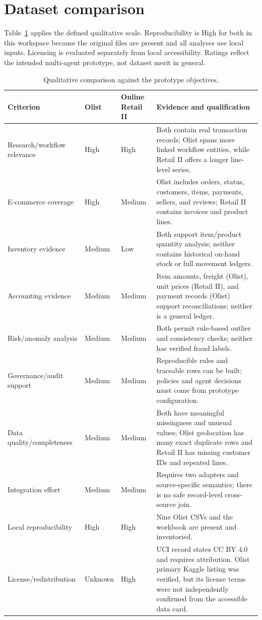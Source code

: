 \documentclass[11pt,a4paper]{article}
\begin{document}
\section{Dataset comparison}
Table~\ref{tab:comparison} applies the defined qualitative scale. Reproducibility is High for both in this workspace because the original files are present and all analyses use local inputs. Licensing is evaluated separately from local accessibility. Ratings reflect the intended multi-agent prototype, not dataset merit in general.
\begin{table}[ht]
\centering\small
\caption{Qualitative comparison against the prototype objectives.}
\label{tab:comparison}
\begin{tabularx}{\textwidth}{>{\raggedright\arraybackslash}p{}>{\raggedright\arraybackslash}p{}>{\raggedright\arraybackslash}p{}>{\raggedright\arraybackslash}X}
\toprule
Criterion & Olist & Online Retail II & Evidence and qualification\\
\midrule
Research/workflow relevance & High & High & Both contain real transaction records; Olist spans more linked workflow entities, while Retail II offers a longer line-level series.\\
E-commerce coverage & High & Medium & Olist includes orders, status, customers, items, payments, sellers, and reviews; Retail II contains invoices and product lines.\\
Inventory evidence & Medium & Low & Both support item/product quantity analysis; neither contains historical on-hand stock or full movement ledgers.\\
Accounting evidence & Medium & Medium & Item amounts, freight (Olist), unit prices (Retail II), and payment records (Olist) support reconciliations; neither is a general ledger.\\
Risk/anomaly analysis & Medium & Medium & Both permit rule-based outlier and consistency checks; neither has verified fraud labels.\\
Governance/audit support & Medium & Medium & Reproducible rules and traceable rows can be built; policies and agent decisions must come from prototype configuration.\\
Data quality/completeness & Medium & Medium & Both have meaningful missingness and unusual values; Olist geolocation has many exact duplicate rows and Retail II has missing customer IDs and repeated lines.\\
Integration effort & Medium & Medium & Requires two adapters and source-specific semantics; there is no safe record-level cross-source join.\\
Local reproducibility & High & High & Nine Olist CSVs and the workbook are present and inventoried.\\
License/redistribution & Unknown & High & UCI record states CC BY 4.0 and requires attribution. Olist primary Kaggle listing was verified, but its license terms were not independently confirmed from the accessible data card.\\
\bottomrule
\end{tabularx}
\end{table}
\end{document}
